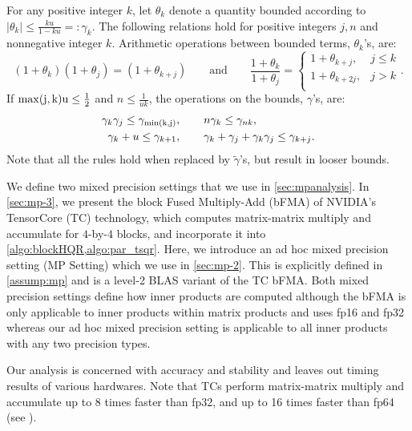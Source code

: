 \documentclass[review,onefignum,onetabnum]{siamart190516}
\newcommand{\tth}{\theta}
\begin{document}
\begin{lemma}
\label{lem:up}
For any positive integer $k$, let $\tth_{k}$ denote a quantity bounded according to $|\tth_{k}|\leq \frac{k u }{1-ku} =:\gamma_{k}$. The following relations hold for positive integers $j,n$ and nonnegative integer $k$.
Arithmetic operations between bounded terms, $\tth_{k}$'s, are: 
\begin{equation}
(1+\tth_{k})(1+\tth_{j})=(1+\tth_{k+j})\qquad \mbox{and} \qquad\frac{1+\tth_{k}}{1+\tth_{j}} =
\begin{cases}
	1+\tth_{k+j},& j \leq k\\
	1+\tth_{k+2j},& j > k\\
\end{cases} .
\end{equation}
If $\rm{max}(j,k) u \leq \frac{1}{2}$ and $n \leq \frac{1}{uk}$, the operations on the bounds, $\gamma$'s, are:
	\begin{align*}
	\gamma_{k}\gamma_{j} \leq \gamma_{\rm{min}(k,j)}&,\qquad n\gamma_{k} \leq \gamma_{nk},\\
	\gamma_{k} + u \leq \gamma_{k+1}&,\qquad \gamma_{k}+\gamma_{j}+\gamma_{k}\gamma_{j} \leq \gamma_{k+j}.
	\end{align*}
Note that all the rules hold when replaced by $\tilde{\gamma}$'s, but result in looser bounds.
\end{lemma}

We define two mixed precision settings that we use in \cref{sec:mpanalysis}.
In \cref{sec:mp-3}, we present the block Fused Multiply-Add (bFMA) of NVIDIA's TensorCore (TC) technology, which computes matrix-matrix multiply and accumulate for $4$-by-$4$ blocks, and incorporate it into \cref{algo:blockHQR,algo:par_tsqr}.
Here, we introduce an ad hoc mixed precision setting (MP Setting) which we use in \cref{sec:mp-2}.
This is explicitly defined in \cref{assump:mp} and is a level-2 BLAS variant of the TC bFMA. 
Both mixed precision settings define how inner products are computed although the bFMA is only applicable to inner products within matrix products and uses fp16 and fp32 whereas our ad hoc mixed precision setting is applicable to all inner products with any two precision types.\par

Our analysis is concerned with accuracy and stability and leaves out timing results of various hardwares.
Note that TCs perform matrix-matrix multiply and accumulate up to 8 times faster than fp32, and up to 16 times faster than fp64 (see \cite{Markidis2018}).
\end{document}
